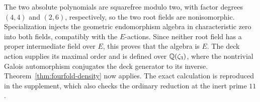 The two absolute polynomials are squarefree modulo two, with factor
degrees \((4,4)\) and \((2,6)\), respectively, so the two root fields
are nonisomorphic. Specialization injects the geometric endomorphism
algebra in characteristic zero into both fields, compatibly with
the \(E\)-actions. Since neither root field has a proper intermediate
field over \(E\), this proves that the algebra is \(E\). The deck
action supplies its maximal order and is defined over
\(\mathbb Q(\zeta_3)\), where the nontrivial Galois automorphism conjugates
the deck generator to its inverse. Theorem~\ref{thm:fourfold-density}
now applies. The exact calculation is reproduced in the supplement,
which also checks the ordinary reduction at the inert prime \(11\).
